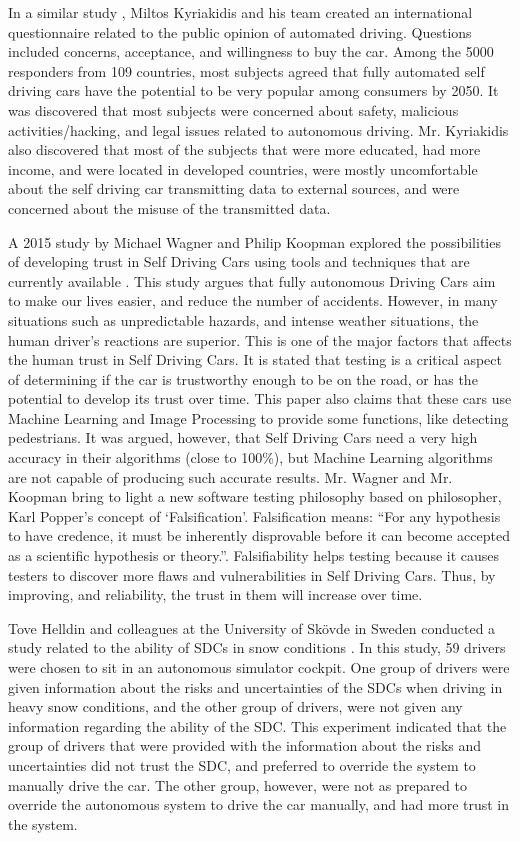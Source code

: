 \documentclass[runningheads,a4paper]{llncs}
\begin{document}
In a similar study \cite{kyriakidis2015public}, Miltos Kyriakidis and his team created an international questionnaire related to the public opinion of automated driving. Questions included concerns, acceptance, and willingness to buy the car. Among the 5000 responders from 109 countries, most subjects agreed that fully automated self driving cars have the potential to be very popular among consumers by 2050. It was discovered that most subjects were concerned about safety, malicious activities/hacking, and legal issues related to autonomous driving. Mr. Kyriakidis also discovered that most of the subjects that were more educated, had more income, and were located in developed countries, were mostly uncomfortable about the self driving car transmitting data to external sources, and were concerned about the misuse of the transmitted data.

A 2015 study by Michael Wagner and Philip Koopman explored the possibilities of developing trust in Self Driving Cars using tools and techniques that are currently available \cite{wagner2015philosophy}. This study argues that fully autonomous Driving Cars aim to make our lives easier, and reduce the number of accidents. However, in many situations such as unpredictable hazards, and intense weather situations, the human driver's reactions are superior. This is one of the major factors that affects the human trust in Self Driving Cars. It is stated that testing is a critical aspect of determining if the car is trustworthy enough to be on the road, or has the potential to develop its trust over time. This paper also claims that these cars use Machine Learning and Image Processing to provide some functions, like detecting pedestrians. It was argued, however, that Self Driving Cars need a very high accuracy in their algorithms (close to 100\%), but Machine Learning algorithms are not capable of producing such accurate results. Mr. Wagner and Mr. Koopman bring to light a new software testing philosophy based on philosopher, Karl Popper's concept of `Falsification'. Falsification means: ``For any hypothesis to have credence, it must be inherently disprovable before it can become accepted as a scientific hypothesis or theory.''\cite{falsifiability}. Falsifiability helps testing because it causes testers to discover more flaws and vulnerabilities in Self Driving Cars. Thus, by improving, and reliability, the trust in them will increase over time.

Tove Helldin and colleagues at the University of Skövde in Sweden conducted a study related to the ability of SDCs in snow conditions \cite{helldin2013presenting}. In this study, 59 drivers were chosen to sit in an autonomous simulator cockpit. One group of drivers were given information about the risks and uncertainties of the SDCs when driving in heavy snow conditions, and the other group of drivers, were not given any information regarding the ability of the SDC. This experiment indicated that the group of drivers that were provided with the information about the risks and uncertainties did not trust the SDC, and preferred to override the system to manually drive the car. The other group, however, were not as prepared to override the autonomous system to drive the car manually, and had more trust in the system.
\end{document}
